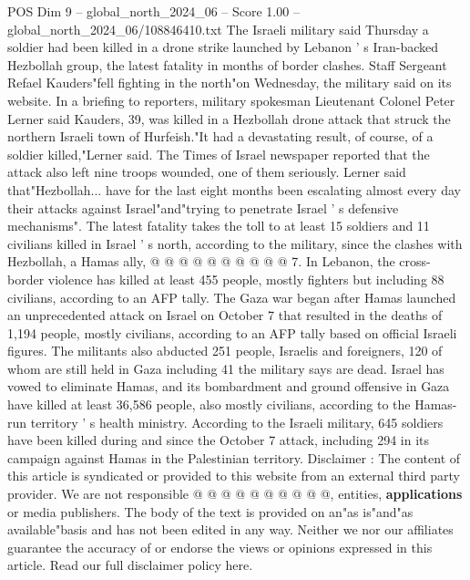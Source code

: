 \begin{textsample}{POS Dim 9 – global\_north\_2024\_06 – Score 1.00 – global\_north\_2024\_06/108846410.txt}  \label{ex:f9_pos_282}
The Israeli military said Thursday a soldier had been killed in a drone strike launched by Lebanon ' s Iran-backed Hezbollah group, the latest fatality in months of border clashes.
Staff Sergeant Refael Kauders"fell fighting in the north"on Wednesday, the military said on its website.
In a briefing to reporters, military spokesman Lieutenant Colonel Peter Lerner said Kauders, 39, was killed in a Hezbollah drone attack that struck the northern Israeli town of Hurfeish."It had a devastating result, of course, of a soldier killed,"Lerner said.
The Times of Israel newspaper reported that the attack also left nine troops wounded, one of them seriously.
Lerner said that"Hezbollah... have for the last eight months been escalating almost every day their attacks against Israel"and"trying to penetrate Israel ' s defensive mechanisms".
The latest fatality takes the toll to at least 15 soldiers and 11 civilians killed in Israel ' s north, according to the military, since the clashes with Hezbollah, a Hamas ally, @ @ @ @ @ @ @ @ @ @ 7.
In Lebanon, the cross-border violence has killed at least 455 people, mostly fighters but including 88 civilians, according to an AFP tally.
The Gaza war began after Hamas launched an unprecedented attack on Israel on October 7 that resulted in the deaths of 1,194 people, mostly civilians, according to an AFP tally based on official Israeli figures.
The militants also abducted 251 people, Israelis and foreigners, 120 of whom are still held in Gaza including 41 the military says are dead.
Israel has vowed to eliminate Hamas, and its bombardment and ground offensive in Gaza have killed at least 36,586 people, also mostly civilians, according to the Hamas-run territory ' s health ministry.
According to the Israeli military, 645 soldiers have been killed during and since the October 7 attack, including 294 in its campaign against Hamas in the Palestinian territory.
Disclaimer : The content of this article is syndicated or provided to this website from an external third party provider.
We are not responsible @ @ @ @ @ @ @ @ @ @, entities, \textbf{applications} or media publishers.
The body of the text is provided on an"as is"and"as available"basis and has not been edited in any way.
Neither we nor our affiliates guarantee the accuracy of or endorse the views or opinions expressed in this article.
Read our full disclaimer policy here.

\end{textsample}

